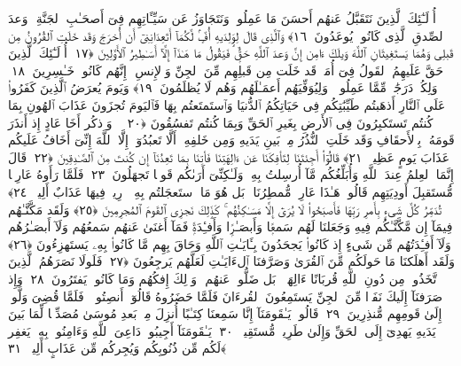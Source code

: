  أُو۟لَـٰٓئِكَ ٱلَّذِينَ نَتَقَبَّلُ عَنهُم أَحسَنَ مَا عَمِلُوا۟ وَنَتَجَاوَزُ عَن سَيِّـَٔاتِهِم فِىٓ أَصحَـٰبِ ٱلجَنَّةِ ۖ وَعدَ ٱلصِّدقِ ٱلَّذِى كَانُوا۟ يُوعَدُونَ ﴿١٦﴾
 وَٱلَّذِى قَالَ لِوَٟلِدَيهِ أُفٍّۢ لَّكُمَآ أَتَعِدَانِنِىٓ أَن أُخرَجَ وَقَد خَلَتِ ٱلقُرُونُ مِن قَبلِى وَهُمَا يَستَغِيثَانِ ٱللَّهَ وَيلَكَ ءَامِن إِنَّ وَعدَ ٱللَّهِ حَقٌّۭ فَيَقُولُ مَا هَـٰذَآ إِلَّآ أَسَـٰطِيرُ ٱلأَوَّلِينَ ﴿١٧﴾
 أُو۟لَـٰٓئِكَ ٱلَّذِينَ حَقَّ عَلَيهِمُ ٱلقَولُ فِىٓ أُمَمٍۢ قَد خَلَت مِن قَبلِهِم مِّنَ ٱلجِنِّ وَٱلإِنسِ ۖ إِنَّهُم كَانُوا۟ خَـٰسِرِينَ ﴿١٨﴾
 وَلِكُلٍّۢ دَرَجَٰتٌۭ مِّمَّا عَمِلُوا۟ ۖ وَلِيُوَفِّيَهُم أَعمَـٰلَهُم وَهُم لَا يُظلَمُونَ ﴿١٩﴾
 وَيَومَ يُعرَضُ ٱلَّذِينَ كَفَرُوا۟ عَلَى ٱلنَّارِ أَذهَبتُم طَيِّبَٰتِكُم فِى حَيَاتِكُمُ ٱلدُّنيَا وَٱستَمتَعتُم بِهَا فَٱليَومَ تُجزَونَ عَذَابَ ٱلهُونِ بِمَا كُنتُم تَستَكبِرُونَ فِى ٱلأَرضِ بِغَيرِ ٱلحَقِّ وَبِمَا كُنتُم تَفسُقُونَ ﴿٢٠﴾
 ۞ وَٱذكُر أَخَا عَادٍ إِذ أَنذَرَ قَومَهُۥ بِٱلأَحقَافِ وَقَد خَلَتِ ٱلنُّذُرُ مِنۢ بَينِ يَدَيهِ وَمِن خَلفِهِۦٓ أَلَّا تَعبُدُوٓا۟ إِلَّا ٱللَّهَ إِنِّىٓ أَخَافُ عَلَيكُم عَذَابَ يَومٍ عَظِيمٍۢ ﴿٢١﴾
 قَالُوٓا۟ أَجِئتَنَا لِتَأفِكَنَا عَن ءَالِهَتِنَا فَأتِنَا بِمَا تَعِدُنَآ إِن كُنتَ مِنَ ٱلصَّـٰدِقِينَ ﴿٢٢﴾
 قَالَ إِنَّمَا ٱلعِلمُ عِندَ ٱللَّهِ وَأُبَلِّغُكُم مَّآ أُرسِلتُ بِهِۦ وَلَـٰكِنِّىٓ أَرَىٰكُم قَومًۭا تَجهَلُونَ ﴿٢٣﴾
 فَلَمَّا رَأَوهُ عَارِضًۭا مُّستَقبِلَ أَودِيَتِهِم قَالُوا۟ هَـٰذَا عَارِضٌۭ مُّمطِرُنَا ۚ بَل هُوَ مَا ٱستَعجَلتُم بِهِۦ ۖ رِيحٌۭ فِيهَا عَذَابٌ أَلِيمٌۭ ﴿٢٤﴾
 تُدَمِّرُ كُلَّ شَىءٍۭ بِأَمرِ رَبِّهَا فَأَصبَحُوا۟ لَا يُرَىٰٓ إِلَّا مَسَـٰكِنُهُم ۚ كَذَٟلِكَ نَجزِى ٱلقَومَ ٱلمُجرِمِينَ ﴿٢٥﴾
 وَلَقَد مَكَّنَّـٰهُم فِيمَآ إِن مَّكَّنَّـٰكُم فِيهِ وَجَعَلنَا لَهُم سَمعًۭا وَأَبصَـٰرًۭا وَأَفـِٔدَةًۭ فَمَآ أَغنَىٰ عَنهُم سَمعُهُم وَلَآ أَبصَـٰرُهُم وَلَآ أَفـِٔدَتُهُم مِّن شَىءٍ إِذ كَانُوا۟ يَجحَدُونَ بِـَٔايَـٰتِ ٱللَّهِ وَحَاقَ بِهِم مَّا كَانُوا۟ بِهِۦ يَستَهزِءُونَ ﴿٢٦﴾
 وَلَقَد أَهلَكنَا مَا حَولَكُم مِّنَ ٱلقُرَىٰ وَصَرَّفنَا ٱلءَايَـٰتِ لَعَلَّهُم يَرجِعُونَ ﴿٢٧﴾
 فَلَولَا نَصَرَهُمُ ٱلَّذِينَ ٱتَّخَذُوا۟ مِن دُونِ ٱللَّهِ قُربَانًا ءَالِهَةًۢ ۖ بَل ضَلُّوا۟ عَنهُم ۚ وَذَٟلِكَ إِفكُهُم وَمَا كَانُوا۟ يَفتَرُونَ ﴿٢٨﴾
 وَإِذ صَرَفنَآ إِلَيكَ نَفَرًۭا مِّنَ ٱلجِنِّ يَستَمِعُونَ ٱلقُرءَانَ فَلَمَّا حَضَرُوهُ قَالُوٓا۟ أَنصِتُوا۟ ۖ فَلَمَّا قُضِىَ وَلَّوا۟ إِلَىٰ قَومِهِم مُّنذِرِينَ ﴿٢٩﴾
 قَالُوا۟ يَـٰقَومَنَآ إِنَّا سَمِعنَا كِتَـٰبًا أُنزِلَ مِنۢ بَعدِ مُوسَىٰ مُصَدِّقًۭا لِّمَا بَينَ يَدَيهِ يَهدِىٓ إِلَى ٱلحَقِّ وَإِلَىٰ طَرِيقٍۢ مُّستَقِيمٍۢ ﴿٣٠﴾
 يَـٰقَومَنَآ أَجِيبُوا۟ دَاعِىَ ٱللَّهِ وَءَامِنُوا۟ بِهِۦ يَغفِر لَكُم مِّن ذُنُوبِكُم وَيُجِركُم مِّن عَذَابٍ أَلِيمٍۢ ﴿٣١﴾

